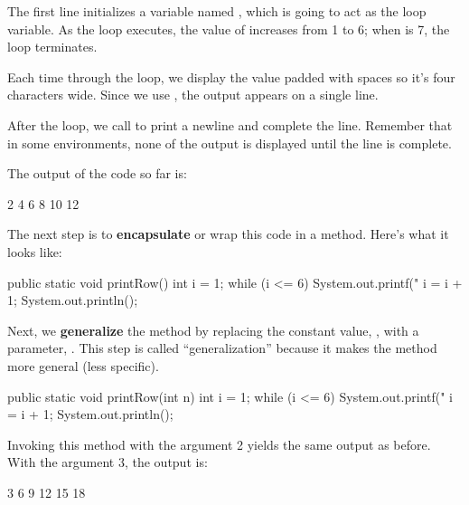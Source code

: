 
The first line initializes a variable named , which is going to act as the loop variable.
As the loop executes, the value of  increases from 1 to 6; when  is 7, the loop terminates.

Each time through the loop, we display the value  padded with spaces so it's four characters wide.
Since we use , the output appears on a single line.

After the loop, we call  to print a newline and complete the line.
Remember that in some environments, none of the output is displayed until the line is complete.

The output of the code so far is:

\begin{stdout}
   2   4   6   8  10  12
\end{stdout}


The next step is to {\bf encapsulate} or wrap this code in a method.
Here's what it looks like:

\begin{code}
public static void printRow() {
    int i = 1;
    while (i <= 6) {
        System.out.printf("%
        i = i + 1;
    }
    System.out.println();
}
\end{code}


Next, we {\bf generalize} the method by replacing the constant value, , with a parameter, .
This step is called ``generalization'' because it makes the method more general (less specific).

\begin{code}
public static void printRow(int n) {
    int i = 1;
    while (i <= 6) {
        System.out.printf("%
        i = i + 1;
    }
    System.out.println();
}
\end{code}

Invoking this method with the argument 2 yields the same output as before.
With the argument 3, the output is:

\begin{stdout}
   3   6   9  12  15  18
\end{stdout}

%

